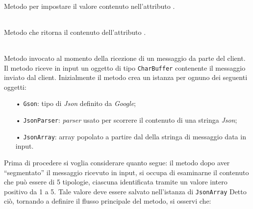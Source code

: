 \begin{description}

	\item{}\\
	Metodo per impostare il valore contenuto nell'attributo .
	
	\item{}\\
	Metodo che ritorna il contenuto dell'attributo .
	
	\item{}\\
	Metodo invocato al momento della ricezione di un messaggio da parte del client. Il metodo riceve in input un oggetto di tipo \texttt{CharBuffer} contenente il messaggio inviato dal client.
Inizialmente il metodo crea un istanza per ognuno dei seguenti oggetti:
	\begin{itemize}
		\item[•]\texttt{Gson}: tipo di \textit{Json} definito da \textit{Google};
		\item[•]\texttt{JsonParser}: \textit{parser} usato per scorrere il contenuto di una stringa \textit{Json};
		\item[•]\texttt{JsonArray}: array popolato a partire dal  della stringa di messaggio data in input.
	\end{itemize}
	
	Prima di procedere si voglia considerare quanto segue: il metodo dopo aver ``segmentato'' il messaggio ricevuto in input, si occupa di esaminarne il contenuto che può essere di 5 tipologie, ciascuna identificata tramite un valore intero positivo da 1 a 5. Tale valore deve essere salvato nell'istanza di \texttt{JsonArray}
	Detto ciò, tornando a definire il flusso principale del metodo, si osservi che:


\end{description}
